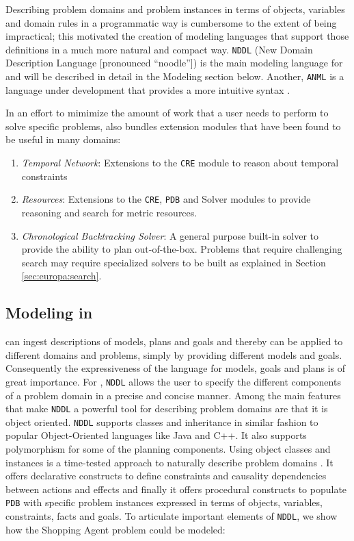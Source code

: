 Describing problem domains and problem instances in terms of objects,
variables and domain rules in a programmatic way is cumbersome to the
extent of being impractical; this motivated the creation of modeling
languages that support those definitions in a much more natural and
compact way. \texttt{NDDL} (New Domain Description Language
[pronounced ``noodle'']) \cite{NDDL} is the main modeling language for
\eu and will be described in detail in the Modeling section
below. Another, \texttt{ANML} is a language under development that
provides a more intuitive syntax \cite{smith08}.
  
In an effort to mimimize the amount of work that a user needs to
perform to solve specific problems, \eu also bundles extension
modules that have been found to be useful in many domains:

\begin{enumerate}

\item \textit{Temporal Network}: Extensions to the \texttt{CRE} module to
  reason about temporal constraints

\item \textit{Resources}: Extensions to the \texttt{CRE}, \texttt{PDB}
  and Solver modules to provide reasoning and search for metric
  resources.

\item \textit{Chronological Backtracking Solver}: A general purpose
  built-in solver to provide the ability to plan out-of-the-box.
  Problems that require challenging search may require specialized
  solvers to be built as explained in Section \ref{sec:europa:search}.

\end{enumerate}

\subsection{Modeling in \eu}
\label{sec:europa:modeling}

\eu can ingest descriptions of models, plans and goals and thereby can
be applied to different domains and problems, simply by providing
different models and goals. Consequently the expressiveness of the
language for models, goals and plans is of great importance. For \eue,
\texttt{NDDL} allows the user to specify the different components of a
problem domain in a precise and concise manner. Among the main
features that make \texttt{NDDL} a powerful tool for describing
problem domains are that it is object oriented. \texttt{NDDL} supports
classes and inheritance in similar fashion to popular Object-Oriented
languages like Java and C++. It also supports polymorphism for some of
the planning components. Using object classes and instances is a
time-tested approach to naturally describe problem domains
\cite{rumbaugh}. It offers declarative constructs to define
constraints and causality dependencies between actions and effects and
finally it offers procedural constructs to populate \eus \texttt{PDB}
with specific problem instances expressed in terms of objects,
variables, constraints, facts and goals. To articulate important
elements of \texttt{NDDL}, we show how the Shopping Agent problem
could be modeled:

